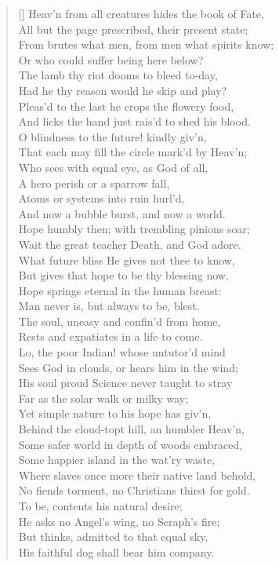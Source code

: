 \begin{verse}[\versewidth]
Heav'n from all creatures hides the book of Fate,\\
All but the page prescribed, their present state;\\
From brutes what men, from men what spirits know;\\
Or who could suffer being here below?\\
The lamb thy riot dooms to bleed to-day,\\
Had he thy reason would he skip and play?\\
Pleas'd to the last he crops the flowery food,\\
And licks the hand just rais'd to shed his blood.\\
O blindness to the future! kindly giv'n,\\
That each may fill the circle mark'd by Heav'n;\\
Who sees with equal eye, as God of all,\\
A hero perish or a sparrow fall,\\
Atoms or systems into ruin hurl'd,\\
And now a bubble burst, and now a world.\\
\vin Hope humbly then; with trembling pinions soar;\\
Wait the great teacher Death, and God adore.\\
What future bliss He gives not thee to know,\\
But gives that hope to be thy blessing now.\\
Hope springs eternal in the human breast:\\
Man never is, but always to be, blest.\\
The soul, uneasy and confin'd from home,\\
Rests and expatiates in a life to come.\\
\vin Lo, the poor Indian! whose untutor'd mind\\
Sees God in clouds, or hears him in the wind;\\
His soul proud Science never taught to stray\\
Far as the solar walk or milky way;\\
Yet simple nature to his hope has giv'n,\\
Behind the cloud-topt hill, an humbler Heav'n,\\
Some safer world in depth of woods embraced,\\
Some happier island in the wat'ry waste,\\
Where slaves once more their native land behold,\\
No fiends torment, no Christians thirst for gold.\\
To be, contents his natural desire;\\
He asks no Angel's wing, no Seraph's fire;\\
But thinks, admitted to that equal sky,\\
His faithful dog shall bear him company.


\end{verse}
